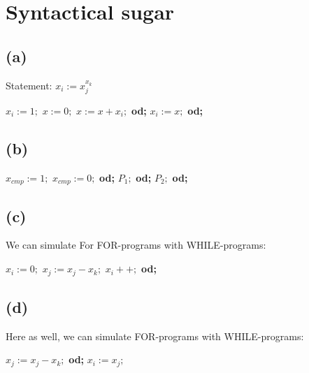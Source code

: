 

\usepackage{algorithm}
\usepackage[noend]{algpseudocode}

\setcounter{section}{1}

\section{Syntactical sugar}

\subsection{(a)}

Statement: \( x_i := x_j^{x_k} \)

\begin{algorithmic}[1]
\State \( x_i := 1; \)
    \State \( x := 0; \)
        \State \( x := x + x_i; \)
    \EndFor \textbf{od;}
    \State \( x_i := x; \)
\EndFor \textbf{od;}
\end{algorithmic}


\subsection{(b)}

\begin{algorithmic}[1]
\State \( x_{cmp} := 1; \)  
    \State \( x_{cmp} := 0; \) 
\EndFor \textbf{od;}
     \( P_1; \)
\EndFor \textbf{od;}
    \State\( P_2; \)
\EndFor \textbf{od;}
\end{algorithmic}


\subsection{(c)}
We can simulate For FOR-programs with WHILE-programs:

\begin{algorithmic}[1]
\State \( x_i := 0; \)
    \State \( x_j := x_j - x_k; \)
    \State \( x_i++; \)
\EndWhile \textbf{od;}
\end{algorithmic}
\subsection{(d)}
Here as well, we can simulate FOR-programs with WHILE-programs:

\begin{algorithmic}[1]
    \State \( x_j := x_j - x_k; \)
\EndWhile \textbf{od;}
\State \( x_i := x_j; \)
\end{algorithmic}

